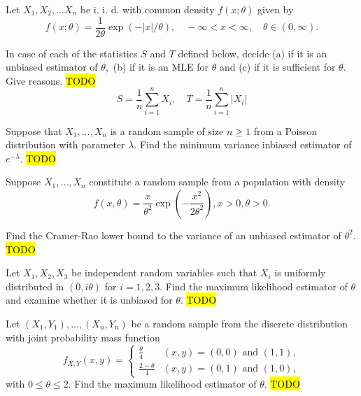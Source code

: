 \begin{example}
\label{exa:isi2004samplepsb8}Let $X_{1},X_{2},\ldots X_{n}$ be i.
i. d. with common density $f(x;\theta)$ given by 
\[
f(x;\theta)=\frac{1}{2\theta}\exp(-|x|/\theta),\quad-\infty<x<\infty,\quad\theta\in(0,\infty).
\]

In case of each of the statistics $S$ and $T$ defined below, decide
(a) if it is an unbiased estimator of $\theta,$ (b) if it is an MLE
for $\theta$ and (c) if it is sufficient for $\theta$. Give reasons.
\hl{TODO}
\[
S=\frac{1}{n}\sum_{i=1}^{n}X_{i},\quad T=\frac{1}{n}\sum_{i=1}^{n}\left|X_{i}\right|
\]
\end{example}

\begin{example}
\label{exa:isi2005samplepsb7}Suppose that $X_{1},\ldots,X_{n}$ is
a random sample of size $n\geq1$ from a Poisson distribution with
parameter $\lambda$. Find the minimum variance inbiased estimator
of $e^{-\lambda}$. \hl{TODO}
\end{example}

\begin{example}
\label{exa:isi2005samplepsb8}Suppose $X_{1},\ldots,X_{n}$ constitute
a random sample from a population with density 
\[
f(x,\theta)=\frac{x}{\theta^{2}}\exp\left(-\frac{x^{2}}{2\theta^{2}}\right),x>0,\theta>0.
\]

Find the Cramer-Rao lower bound to the variance of an unbiased estimator
of $\theta^{2}$. \hl{TODO}
\end{example}

\begin{example}
\label{exa:isi2005samplepsb9}Let $X_{1},X_{2},X_{3}$ be independent
random variables such that $X_{i}$ is uniformly distributed in $(0,i\theta)$
for $i=1,2,3$. Find the maximum likelihood estimator of $\theta$
and examine whether it is unbiased for $\theta$. \hl{TODO}
\end{example}

\begin{example}
\label{exa:isi2006samplepsb8}Let $\left(X_{1},Y_{1}\right),\ldots,\left(X_{n},Y_{n}\right)$
be a random sample from the discrete distribution with joint probability
mass function 
\[
f_{X,Y}(x,y)=\begin{cases}
\frac{\theta}{4} & (x,y)=(0,0)\text{ and }(1,1),\\
\frac{2-\theta}{4} & (x,y)=(0,1)\text{ and }(1,0),
\end{cases}
\]
 with $0\leq\theta\leq2$. Find the maximum likelihood estimator of
$\theta$. \hl{TODO}
\end{example}

